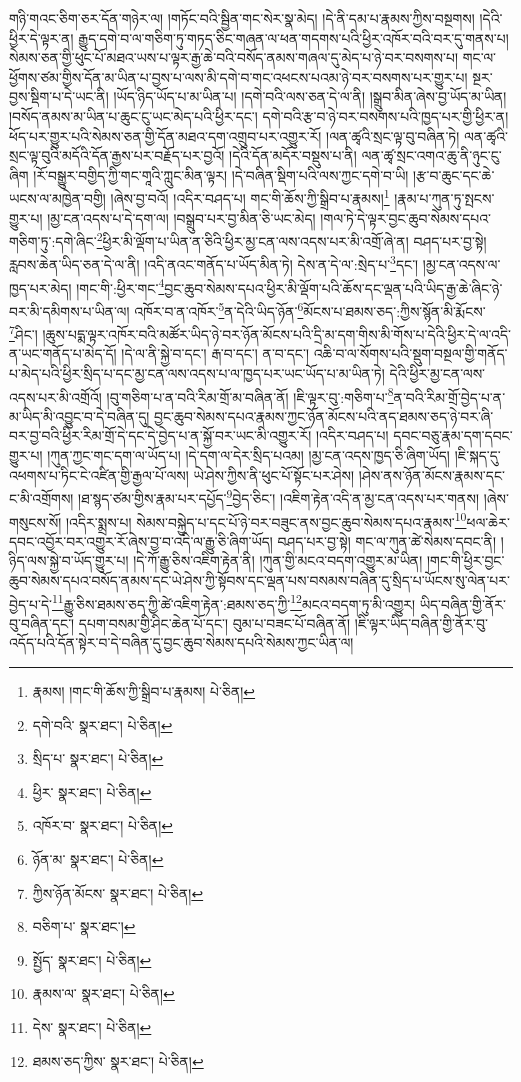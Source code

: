 གཉི་གའང་ཅིག་ཅར་དོན་གཉེར་ལ། །གཏོང་བའི་སྦྱིན་གང་སེར་སྣ་མེད། །དེ་ནི་དམ་པ་རྣམས་ཀྱིས་བསྔགས། །དེའི་ཕྱིར་དེ་ལྟར་ན། རྒྱུད་དགེ་བ་ལ་གཅིག་ཏུ་གཏད་ཅིང་གཞན་ལ་ཕན་གདགས་པའི་ཕྱིར་འཁོར་བའི་བར་དུ་གནས་པ། སེམས་ཅན་གྱི་ཕུང་པོ་མཐའ་ཡས་པ་ལྟར་རྒྱ་ཆེ་བའི་བསོད་ནམས་གཞལ་དུ་མེད་པ་ཉེ་བར་བསགས་པ། གང་ལ་ཕྱོགས་ཙམ་གྱིས་དོན་མ་ཡིན་པ་བྱས་པ་ལས་མི་དགེ་བ་གང་འཕངས་པའམ་ཉེ་བར་བསགས་པར་གྱུར་པ། སྔར་བྱས་སྡིག་པ་དེ་ཡང་ནི། །ཡོད་ཉིད་ཡོད་པ་མ་ཡིན་པ། །དགེ་བའི་ལས་ཅན་དེ་ལ་ནི། །སྒྲུབ་མིན་ཞེས་བྱ་ཡོད་མ་ཡིན། །བསོད་ནམས་མ་ཡིན་པ་ཆུང་ངུ་ཡང་མེད་པའི་ཕྱིར་དང་། དགེ་བའི་རྩ་བ་ཉེ་བར་བསགས་པའི་ཁྱད་པར་གྱི་ཕྱིར་ན། ཕོད་པར་གྱུར་པའི་སེམས་ཅན་གྱི་དོན་མཐའ་དག་འགྲུབ་པར་འགྱུར་རོ། །ལན་ཚྭའི་སྲང་ལྟ་བུ་བཞིན་ཏེ། ལན་ཚྭའི་སྲང་ལྟ་བུའི་མདོའི་དོན་རྒྱས་པར་བརྗོད་པར་བྱའོ། །དེའི་དོན་མདོར་བསྡུས་པ་ནི། ལན་ཚྭ་སྲང་འགའ་ཆུ་ནི་ཉུང་ངུ་ཞིག །རོ་བསྒྱུར་བགྱིད་ཀྱི་གང་གཱའི་ཀླུང་མིན་ལྟར། །དེ་བཞིན་སྡིག་པའི་ལས་ཀྱང་དགེ་བ་ཡི། །རྩ་བ་ཆུང་དང་ཆེ་ཡངས་ལ་མཁྱེན་བགྱི། །ཞེས་བྱ་བའོ། །འདིར་བཤད་པ། གང་གི་ཆོས་ཀྱི་སྒྲིབ་པ་རྣམས།\footnote{རྣམས། །གང་གི་ཆོས་ཀྱི་སྒྲིབ་པ་རྣམས།  པེ་ཅིན། } །རྣམ་པ་ཀུན་ཏུ་སྤངས་གྱུར་པ། །མྱ་ངན་འདས་པ་དེ་དག་ལ། །བསྒྲུབ་པར་བྱ་མིན་ཅི་ཡང་མེད། །གལ་ཏེ་དེ་ལྟར་བྱང་ཆུབ་སེམས་དཔའ་གཅིག་ཏུ་:དགེ་ཞིང་\footnote{དགེ་བའི་  སྣར་ཐང་།  པེ་ཅིན། }ཕྱིར་མི་ལྡོག་པ་ཡིན་ན་ཅིའི་ཕྱིར་མྱ་ངན་ལས་འདས་པར་མི་འགྲོ་ཞེ་ན། བཤད་པར་བྱ་སྟེ། རླབས་ཆེན་ཡིད་ཅན་དེ་ལ་ནི། །འདི་ནའང་གནོད་པ་ཡོད་མིན་ཏེ། དེས་ན་དེ་ལ་:སྲེད་པ་\footnote{སྲིད་པ་  སྣར་ཐང་།  པེ་ཅིན། }དང་། །མྱ་ངན་འདས་ལ་ཁྱད་པར་མེད། །གང་གི་:ཕྱིར་གང་\footnote{ཕྱིར་  སྣར་ཐང་།  པེ་ཅིན། }བྱང་ཆུབ་སེམས་དཔའ་ཕྱིར་མི་ལྡོག་པའི་ཆོས་དང་ལྡན་པའི་ཡིད་རྒྱ་ཆེ་ཞིང་ཉེ་བར་མི་དམིགས་པ་ཡིན་ལ། འཁོར་བ་ན་འཁོར་\footnote{འཁོར་བ་  སྣར་ཐང་།  པེ་ཅིན། }ན་དེའི་ཡིད་ཉོན་\footnote{ཉོན་མ་  སྣར་ཐང་།  པེ་ཅིན། }མོངས་པ་ཐམས་ཅད་:ཀྱིས་སྙོན་མི་རྨོངས་\footnote{ཀྱིས་ཉོན་མོངས་  སྣར་ཐང་།  པེ་ཅིན། }ཤིང་། །ཆུས་པདྨ་ལྟར་འཁོར་བའི་མཚོར་ཡིད་ཉེ་བར་ཉོན་མོངས་པའི་དྲི་མ་དག་གིས་མི་གོས་པ་དེའི་ཕྱིར་དེ་ལ་འདི་ན་ཡང་གནོད་པ་མེད་དོ། །དེ་ལ་ནི་སྐྱེ་བ་དང་། རྒ་བ་དང་། ན་བ་དང་། འཆི་བ་ལ་སོགས་པའི་སྡུག་བསྔལ་གྱི་གནོད་པ་མེད་པའི་ཕྱིར་སྲིད་པ་དང་མྱ་ངན་ལས་འདས་པ་ལ་ཁྱད་པར་ཡང་ཡོད་པ་མ་ཡིན་ཏེ། དེའི་ཕྱིར་མྱ་ངན་ལས་འདས་པར་མི་འགྲོའོ། །བུ་གཅིག་པ་ན་བའི་རིམ་གྲོ་མ་བཞིན་ནོ། །ཇི་ལྟར་བུ་:གཅིག་པ་\footnote{བཅིག་པ་  སྣར་ཐང་། }ན་བའི་རིམ་གྲོ་བྱེད་པ་ན་མ་ཡིད་མི་འབྱུང་བ་དེ་བཞིན་དུ། བྱང་ཆུབ་སེམས་དཔའ་རྣམས་ཀྱང་ཉོན་མོངས་པའི་ནད་ཐམས་ཅད་ཉེ་བར་ཞི་བར་བྱ་བའི་ཕྱིར་རིམ་གྲོ་དེ་དང་དེ་བྱེད་པ་ན་སྐྱོ་བར་ཡང་མི་འགྱུར་རོ། །འདིར་བཤད་པ། དབང་བཅུ་རྣམ་དག་དབང་གྱུར་པ། །ཀུན་ཀྱང་གང་དག་ལ་ཡོད་པ། །དེ་དག་ལ་དེར་སྲིད་པའམ། །མྱ་ངན་འདས་ཁྱད་ཅི་ཞིག་ཡོད། །ཇི་སྐད་དུ་འཕགས་པ་ཏིང་ངེ་འཛིན་གྱི་རྒྱལ་པོ་ལས། ཡེ་ཤེས་ཀྱིས་ནི་ཕུང་པོ་སྟོང་པར་ཤེས། །ཤེས་ནས་ཉོན་མོངས་རྣམས་དང་ང་མི་འགྲོགས། །ཐ་སྙད་ཙམ་གྱིས་རྣམ་པར་དཔྱོད་\footnote{སྤྱོད་  སྣར་ཐང་།  པེ་ཅིན། }བྱེད་ཅིང་། །འཇིག་རྟེན་འདི་ན་མྱ་ངན་འདས་པར་གནས། །ཞེས་གསུངས་སོ། །འདིར་སྨྲས་པ། སེམས་བསྐྱེད་པ་དང་པོ་ཉེ་བར་བཟུང་ནས་བྱང་ཆུབ་སེམས་དཔའ་རྣམས་\footnote{རྣམས་ལ་  སྣར་ཐང་།  པེ་ཅིན། }ཕལ་ཆེར་དབང་འབྱོར་བར་འགྱུར་རོ་ཞེས་བྱ་བ་འདི་ལ་རྒྱུ་ཅི་ཞིག་ཡོད། བཤད་པར་བྱ་སྟེ། གང་ལ་ཀུན་ཚེ་སེམས་དབང་ནི། །ཉིད་ལས་སྐྱེ་བ་ཡོད་གྱུར་པ། །དེ་ཀོ་རྒྱུ་ཅིས་འཇིག་རྟེན་ནི། །ཀུན་གྱི་མངའ་བདག་འགྱུར་མ་ཡིན། །གང་གི་ཕྱིར་བྱང་ཆུབ་སེམས་དཔའ་བསོད་ནམས་དང་ཡེ་ཤེས་ཀྱི་སྟོབས་དང་ལྡན་པས་བསམས་བཞིན་དུ་སྲིད་པ་ཡོངས་སུ་ལེན་པར་བྱེད་པ་དེ་\footnote{དེས་  སྣར་ཐང་།  པེ་ཅིན། }རྒྱུ་ཅིས་ཐམས་ཅད་ཀྱི་ཚེ་འཇིག་རྟེན་:ཐམས་ཅད་ཀྱི་\footnote{ཐམས་ཅད་ཀྱིས་  སྣར་ཐང་།  པེ་ཅིན། }མངའ་བདག་ཏུ་མི་འགྱུར། ཡིད་བཞིན་གྱི་ནོར་བུ་བཞིན་དང་། དཔག་བསམ་གྱི་ཤིང་ཆེན་པོ་དང་། བུམ་པ་བཟང་པོ་བཞིན་ནོ། །ཇི་ལྟར་ཡིད་བཞིན་གྱི་ནོར་བུ་འདོད་པའི་དོན་སྟེར་བ་དེ་བཞིན་དུ་བྱང་ཆུབ་སེམས་དཔའི་སེམས་ཀྱང་ཡིན་ལ། 
